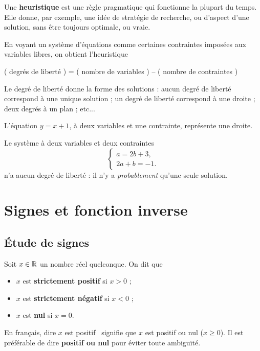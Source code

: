 \documentclass[a4paper, 12pt]{report}
\begin{document}
\begin{nomen}
	Une \textbf{heuristique} est une règle pragmatique qui fonctionne la plupart du temps.
	Elle donne, par exemple, une idée de stratégie de recherche, ou d'aspect d'une solution, sans être toujours optimale, ou vraie.
\end{nomen}

\begin{rmq}
	En voyant un système d'équations comme certaines contraintes imposées aux variables libres, on obtient l'heuristique
		\begin{center}
			( degrés de liberté ) = ( nombre de variables ) -- ( nombre de contraintes )
		\end{center}
	Le degré de liberté donne la forme des solutions : aucun degré de liberté correspond à une unique solution ; un degré de liberté correspond à une droite ; deux degrés à un plan ; etc...
	
	L'équation $y = x + 1$, à deux variables et une contrainte, représente une droite.
	
	Le système à deux variables et deux contraintes
		\[ \begin{cases*} a = 2b + 3, \\ 2a + b = -1. \end{cases*} \]
	n'a aucun degré de liberté : il n'y a \emph{probablement} qu'une seule solution.
\end{rmq}


\chapter{Signes et fonction inverse}
\label{chap:signes}

\section{Étude de signes}

\begin{defn}
	Soit $x\in\mathbb{R}$ un nombre réel quelconque.
	On dit que
		\begin{itemize}
			\item $x$ est \textbf{strictement positif} si $x>0$ ;
			\item $x$ est \textbf{strictement négatif} si $x<0$ ;
			\item $x$ est \textbf{nul} si $x=0$.
		\end{itemize}
	En français, dire \og $x$ est positif \fg~signifie que $x$ est positif ou nul ($x\geq0$).
	Il est préférable de dire \textbf{positif ou nul} pour éviter toute ambiguïté.
\end{defn}
\end{document}

